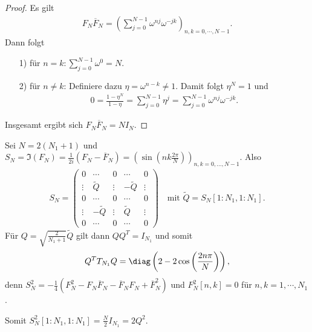 \begin{proof}
    Es gilt
    \begin{eqnarray*}
          F_N \overline F_N
        = \left(\sum_{j=0}^{N-1} \omega^{nj} \omega^{-jk}\right)
          _{n, k = 0, \cdots, N - 1}.
    \end{eqnarray*}
    Dann folgt
    \begin{itemize}
	\item[1)]
	    für $n = k \colon \sum_{j=0}^{N-1} \omega^0 = N$.
	\item[2)]
	    für $n \not = k$: Definiere dazu $\eta = \omega^{n-k} \not = 1$.
	    Damit folgt $\eta^N = 1$ und
	    \begin{eqnarray*}
            0 = \frac{1 - \eta^N}{1 - \eta} = \sum_{j=0}^{N-1} \eta^j
              = \sum_{j=0}^{N-1} \omega^{nj} \omega^{-jk}.
	    \end{eqnarray*}
    \end{itemize}
    Insgesamt ergibt sich $F_N \overline F_N = N I_N$.
\end{proof}


\begin{Anwendung}
    Sei $N = 2 (N_1 + 1)$ und $S_N = \Im(F_N) = \frac{1}{2i}
    (F_N - \overline F_N) = \left(\sin\left(nk \frac{2 \pi}{N}\right)\right)
    _{n, k = 0, \dots, N - 1}$. Also
    \begin{eqnarray*}
          S_N
        = \begin{pmatrix}
              0 & \cdots & 0 & \cdots & 0 \\
              \vdots & \tilde Q & \vdots & -\tilde Q & \vdots \\
              0 & \cdots & 0 & \cdots & 0 \\
              \vdots & -\tilde Q & \vdots & \tilde Q & \vdots \\
              0 & \cdots & 0 & \cdots & 0
          \end{pmatrix} \quad
          \text{mit } \tilde Q = S_N [1:N_1, 1:N_1].
    \end{eqnarray*}
    Für $Q = \sqrt{\frac{2}{N_1 + 1}} \tilde Q$ gilt dann $Q Q^T = I_{N_1}$
    und somit
    \begin{eqnarray*}
          Q^T T_{N_1} Q
        = \diag\left(2 - 2\cos\left(\frac{2 n \pi}{N}\right)\right),
    \end{eqnarray*}
    denn $S_N^2 = -\frac{1}{4} (F_N^2 - F_N \overline F_N - \overline F_N F_N
    + \overline F_N^2)$ und $F_N^2[n,k] = 0$ für $n,k = 1, \cdots, N_1$.

    Somit
    $S_N^2 [1:N_1, 1:N_1] = \frac{N}{2} I_{N_1} = 2 Q^2$.
\end{Anwendung}


